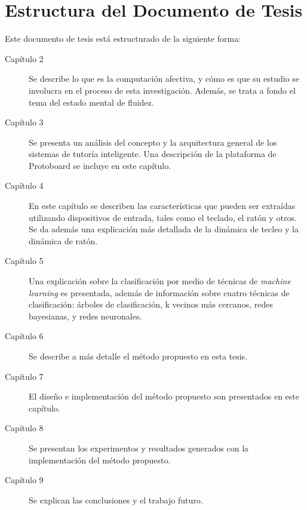 \section{Estructura del Documento de Tesis}

Este documento de tesis está estructurado de la siguiente forma:

\begin{description}

\item[Capítulo 2] Se describe lo que es la computación afectiva, y cómo es que su estudio se involucra en el proceso de esta investigación. Además, se trata a fondo el tema del estado mental de fluidez.

\item[Capítulo 3] Se presenta un análisis del concepto y la arquitectura general de los sistemas de tutoría inteligente. Una descripción de la plataforma de Protoboard se incluye en este capítulo.

\item[Capítulo 4] En este capítulo se describen las características que pueden ser extraídas utilizando dispositivos de entrada, tales como el teclado, el ratón y otros. Se da además una explicación más detallada de la dinámica de tecleo y la dinámica de ratón.

\item[Capítulo 5] Una explicación sobre la clasificación por medio de técnicas de \textit{machine learning} es presentada, además de información sobre cuatro técnicas de clasificación: árboles de clasificación, k vecinos más cercanos, redes bayesianas, y redes neuronales.

\item[Capítulo 6] Se describe a más detalle el método propuesto en esta tesis.

\item[Capítulo 7] El diseño e implementación del método propuesto son presentados en este capítulo.

\item[Capítulo 8] Se presentan los experimentos y resultados generados con la implementación del método propuesto.

\item[Capítulo 9] Se explican las conclusiones y el trabajo futuro.

\end{description}

